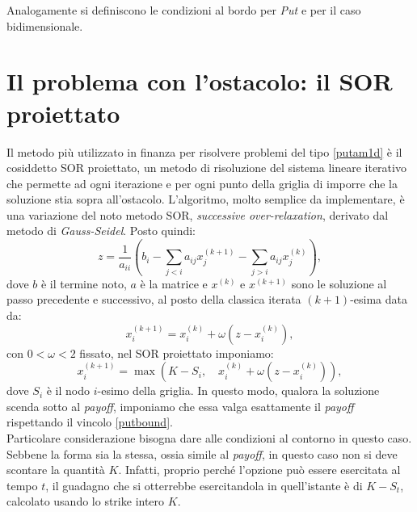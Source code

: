 \documentclass[a4paper,10pt]{report}
\theoremstyle{plain}
\theoremstyle{definition}
\theoremstyle{remark}
\begin{document}
Analogamente si definiscono le condizioni al bordo per \emph{Put} e per il caso bidimensionale.

\section{Il problema con l'ostacolo: il SOR proiettato}
Il metodo pi\`u utilizzato in finanza per risolvere problemi del tipo \eqref{putam1d}  \`e il cosiddetto SOR proiettato, un metodo di risoluzione del sistema lineare iterativo che permette ad ogni iterazione e per ogni punto della griglia di imporre che la soluzione stia sopra all'ostacolo. L'algoritmo, molto semplice da implementare, \`e una variazione del noto metodo SOR, \emph{successive over-relaxation}, derivato dal metodo di \emph{Gauss-Seidel}. Posto quindi: $$z=\frac{1}{a_{ii}}\left(b_i-\sum_{j<i}a_{ij}x_j^{(k+1)}-\sum_{j>i}a_{ij}x_j^{(k)}\right),$$dove $b$ \`e il termine noto, $a$ \`e la matrice e $x^{(k)}$ e $x^{(k+1)}$ sono le soluzione al passo precedente e successivo, al posto della classica iterata $(k+1)$-esima data da: $$x_i^{(k+1)}=x_i^{(k)}+\omega(z-x_i^{(k)}),$$con $0<\omega<2$ fissato, nel SOR proiettato imponiamo: $$x_i^{(k+1)}=\max\left(K-S_i,\quad x_i^{(k)}+\omega(z-x_i^{(k)})\right),$$dove $S_i$ \`e il nodo $i$-esimo della griglia. In questo modo, qualora la soluzione scenda sotto al \emph{payoff}, imponiamo che essa valga esattamente il \emph{payoff} rispettando il vincolo \eqref{putbound}.\\
Particolare considerazione bisogna dare alle condizioni al contorno in questo caso. Sebbene la forma sia la stessa, ossia simile al \emph{payoff}, in questo caso non si deve scontare la quantità $K$. Infatti, proprio perché l'opzione può essere esercitata al tempo $t$, il guadagno che si otterrebbe esercitandola in quell'istante è di $K-S_t$, calcolato usando lo strike intero $K$.
\end{document}
